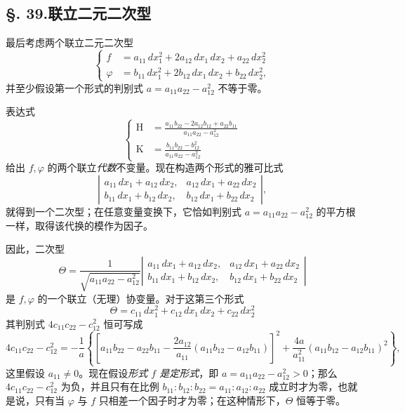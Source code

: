 \subsection*{\S. 39.\quad 联立二元二次型}
最后考虑两个联立二元二次型
\[
\left\{
\begin{aligned}
f&=a_{11}\,dx_1^2+2a_{12}\,dx_1\,dx_2+a_{22}\,dx_2^2\\
\varphi&=b_{11}\,dx_1^2+2b_{12}\,dx_1\,dx_2+b_{22}\,dx_2^2,
\end{aligned}
\right.
\]
并至少假设第一个形式的判别式 $a=a_{11}a_{22}-a_{12}^2$ 不等于零。

表达式
\[
\left\{
\begin{aligned}
\mathrm H&=\frac{a_{11}b_{22}-2a_{12}b_{12}+a_{22}b_{11}}{a_{11}a_{22}-a_{12}^2}\\[0.4em]
\mathrm K&=\frac{b_{11}b_{22}-b_{12}^2}{a_{11}a_{22}-a_{12}^2}
\end{aligned}
\right.
\]
给出 $f,\varphi$ 的两个联立\emph{代数}不变量。现在构造两个形式的雅可比式
\[
\left|\begin{matrix}
a_{11}\,dx_1+a_{12}\,dx_2,&a_{12}\,dx_1+a_{22}\,dx_2\\
b_{11}\,dx_1+b_{12}\,dx_2,&b_{12}\,dx_1+b_{22}\,dx_2
\end{matrix}\right|,
\]
就得到一个二次型；在任意变量变换下，它恰如判别式 $a=a_{11}a_{22}-a_{12}^2$ 的平方根一样，取得该代换的模作为因子。

因此，二次型
\[
\Theta=\frac{1}{\sqrt{a_{11}a_{22}-a_{12}^2}}
\left|\begin{matrix}
a_{11}\,dx_1+a_{12}\,dx_2,&a_{12}\,dx_1+a_{22}\,dx_2\\
b_{11}\,dx_1+b_{12}\,dx_2,&b_{12}\,dx_1+b_{22}\,dx_2
\end{matrix}\right|
\]
是 $f,\varphi$ 的一个联立（无理）协变量。对于这第三个形式
\[
\Theta=c_{11}\,dx_1^2+c_{12}\,dx_1\,dx_2+c_{22}\,dx_2^2
\]
其判别式 $4c_{11}c_{22}-c_{12}^2$ 恒可写成
\[
4c_{11}c_{22}-c_{12}^2=-\frac{1}{a}\left\{\left[a_{11}b_{22}-a_{22}b_{11}-\frac{2a_{12}}{a_{11}}(a_{11}b_{12}-a_{12}b_{11})\right]^2
+\frac{4a}{a_{11}^2}(a_{11}b_{12}-a_{12}b_{11})^2\right\},
\]
这里假设 $a_{11}\ne0$。现在假设\emph{形式 $f$ 是定形式}，即 $a=a_{11}a_{22}-a_{12}^2>0$；那么 $4c_{11}c_{22}-c_{12}^2$ 为负，并且只有在比例 $b_{11}:b_{12}:b_{22}=a_{11}:a_{12}:a_{22}$ 成立时才为零，也就是说，只有当 $\varphi$ 与 $f$ 只相差一个因子时才为零；在这种情形下，$\Theta$ 恒等于零。

